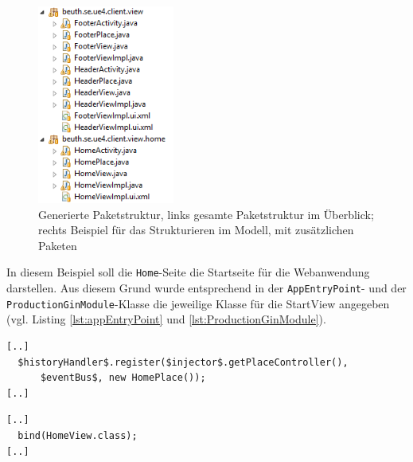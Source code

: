 \begin{figure}[htbp]
\begin{center}
\includegraphics[width=0.4\textwidth]{./img/PackagesExample.png}
\caption{Generierte Paketstruktur, links gesamte
Paketstruktur im Überblick; rechts Beispiel für das
Strukturieren im Modell, mit zusätzlichen Paketen}\label{Fig:packegeModel}
\end{center}
\end{figure}
 
In diesem Beispiel soll die \texttt{Home}-Seite die Startseite für die
Webanwendung darstellen. Aus diesem Grund wurde entsprechend in der
\texttt{AppEntryPoint}- und der \texttt{ProductionGinModule}-Klasse die
jeweilige Klasse für die StartView angegeben (vgl. Listing
\ref{lst:appEntryPoint} und \ref{lst:ProductionGinModule}).
\lstset{language=gwt}
\begin{lstlisting}[caption={Änderung an der \texttt{AppEntryPoint}-Klasse zur
Bestimmung der Startseite}, label={lst:appEntryPoint}] 
[..]
  $historyHandler$.register($injector$.getPlaceController(), 
      $eventBus$, new HomePlace());
[..]
\end{lstlisting}
\lstset{language=gwt}
\begin{lstlisting}[caption={Änderung an der \texttt{ProductionGinModule}-Klasse
zur Bestimmung der Startseite}, label={lst:ProductionGinModule}] 
[..]
  bind(HomeView.class);
[..]
\end{lstlisting}

